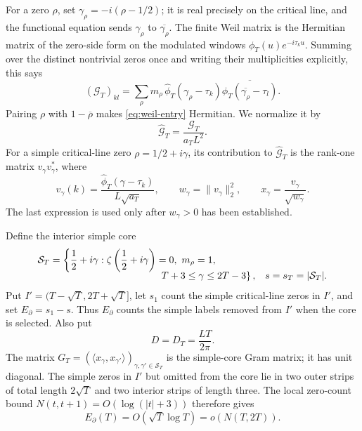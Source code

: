 \documentclass[11pt,reqno]{amsart}
\theoremstyle{definition}
\theoremstyle{remark}
\begin{document}
For a zero $\rho$, set $\gamma_\rho=-i(\rho-1/2)$; it is real precisely on
the critical line, and the functional equation sends $\gamma_\rho$ to
$\overline{\gamma_\rho}$.  The finite Weil matrix is the Hermitian matrix of
the zero-side form on the modulated windows
$\phi_T(u)e^{-i\tau_ku}$.  Summing over the distinct nontrivial zeros once
and writing their multiplicities explicitly, this says
\begin{equation}\label{eq:weil-entry}
 (\mathcal G_T)_{kl}=\sum_\rho m_\rho\,
 \widehat\phi_T(\gamma_\rho-\tau_k)
 \overline{\widehat\phi_T(\overline{\gamma_\rho}-\tau_l)}.
\end{equation}
Pairing $\rho$ with $1-\overline\rho$ makes
\eqref{eq:weil-entry} Hermitian.  We normalize it by
\begin{equation}\label{eq:weil-normalization}
 \widehat{\mathcal G}_T=\frac{\mathcal G_T}{a_TL^2}.
\end{equation}
For a simple critical-line zero $\rho=1/2+i\gamma$, its contribution to
$\widehat{\mathcal G}_T$ is the rank-one matrix $v_\gamma v_\gamma^*$, where
\begin{equation}\label{eq:finite-vector}
 v_\gamma(k)=\frac{\widehat\phi_T(\gamma-\tau_k)}{L\sqrt{a_T}},\qquad
 w_\gamma=\|v_\gamma\|_2^2,\qquad
 x_\gamma=\frac{v_\gamma}{\sqrt{w_\gamma}}.
\end{equation}
The last expression is used only after $w_\gamma>0$ has been established.

Define the interior simple core
\begin{align}\label{eq:simple-core}
 \mathcal S_T&=\left\{\frac12+i\gamma:
   \zeta\left(\frac12+i\gamma\right)=0,\ m_\rho=1,\right.\notag\\[-2mm]
 &\hspace{39mm}\left.T+3\le\gamma\le2T-3\right\},
 & s=s_T=|\mathcal S_T|.
\end{align}
Put $I'=(T-\sqrt T,2T+\sqrt T]$, let $s_1$ count the simple critical-line
zeros in $I'$, and set $E_{\partial}=s_1-s$.  Thus $E_{\partial}$ counts the
simple labels removed from $I'$ when the core is selected.  Also put
\begin{equation}\label{eq:dimension-D}
 D=D_T=\frac{LT}{2\pi}.
\end{equation}
The matrix $G_T=(\langle x_\gamma,x_{\gamma'}\rangle)_
{\gamma,\gamma'\in\mathcal S_T}$ is the simple-core Gram matrix; it has unit
diagonal.  The simple zeros in $I'$ but omitted from the core lie in two
outer strips of total length $2\sqrt T$ and two interior strips of length
three.  The local zero-count
bound $N(t,t+1)=O(\log(|t|+3))$ therefore gives
\begin{equation}\label{eq:boundary-loss}
 E_{\partial}(T)=O(\sqrt T\log T)=o(N(T,2T)).
\end{equation}
\end{document}

